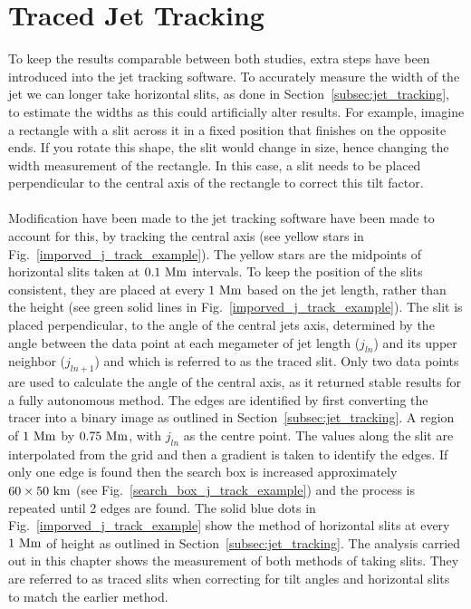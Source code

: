 \documentclass[12pt]{ociamthesis}
\newcommand{\np}{\\ \\}
\begin{document}
\section{Traced Jet Tracking}
\label{sec:tjt}
To keep the results comparable between both studies, extra steps have been introduced into the jet tracking software. To accurately measure the width of the jet we can longer take horizontal slits, as done in Section~\ref{subsec:jet_tracking}, to estimate the widths as this could artificially alter results. For example, imagine a rectangle with a slit across it in a fixed position that finishes on the opposite ends. If you rotate this shape, the slit would change in size, hence changing the width measurement of the rectangle. In this case, a slit needs to be placed perpendicular to the central axis of the rectangle to correct this tilt factor. \np
%
Modification have been made to the jet tracking software have been made to account for this, by tracking the central axis (see yellow stars in Fig.~\ref{imporved_j_track_example}). The yellow stars are the midpoints of horizontal slits taken at $0.1~\rm{Mm}$ intervals. To keep the position of the slits consistent, they are placed at every $1~\rm{Mm}$ based on the jet length, rather than the height (see green solid lines in Fig.~\ref{imporved_j_track_example}). The slit is placed perpendicular, to the angle of the central jets axis, determined by the angle between the data point at each megameter of jet length ($j_{ln}$) and its upper neighbor ($j_{ln+1}$) and which is referred to as the traced slit. Only two data points are used to calculate the angle of the central axis, as it returned stable results for a fully autonomous method. The edges are identified by first converting the tracer into a binary image as outlined in Section~\ref{subsec:jet_tracking}. A region of $1~\rm{Mm}$ by $0.75~\rm{Mm}$, with $j_{ln}$ as the centre point. The values along the slit are interpolated from the grid and then a gradient is taken to identify the edges. If only one edge is found then the search box is increased approximately $60\times 50~\rm{km}$ (see Fig.~\ref{search_box_j_track_example}) and the process is repeated until 2 edges are found. The solid blue dots in  Fig.~\ref{imporved_j_track_example} show the method of horizontal slits at every $1~\rm{Mm}$ of height as outlined in Section~\ref{subsec:jet_tracking}. The analysis carried out in this chapter shows the measurement of both methods of taking slits. They are referred to as traced slits when correcting for tilt angles and horizontal slits to match the earlier method.
\end{document}
